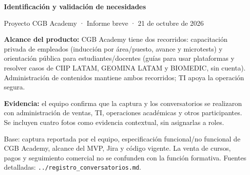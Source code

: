 \documentclass[10pt,a4paper]{extarticle}
\begin{document}
\small
\begin{center}
{\Large\bfseries Identificación y validación de necesidades}\par
Proyecto CGB Academy · Informe breve · 21 de octubre de 2026
\end{center}
\vspace{-4pt}
\textbf{Alcance del producto:} CGB Academy tiene dos recorridos: capacitación privada de empleados (inducción por área/puesto, avance y microtests) y orientación pública para estudiantes/docentes (guías para usar plataformas y resolver casos de CIIP LATAM, GEOMINA LATAM y BIOMEDIC, sin cuenta). Administración de contenidos mantiene ambos recorridos; TI apoya la operación segura.

\textbf{Evidencia:} el equipo confirma que la captura y los conversatorios se realizaron con administración de ventas, TI, operaciones académicas y otros participantes. Se incluyen cuatro fotos como evidencia contextual, sin asignarlas a roles.

Base: captura reportada por el equipo, especificación funcional/no funcional de CGB Academy, alcance del MVP, Jira y código vigente. La venta de cursos, pagos y seguimiento comercial no se confunden con la función formativa. Fuentes detalladas: \texttt{../registro\_conversatorios.md}.
\end{document}
